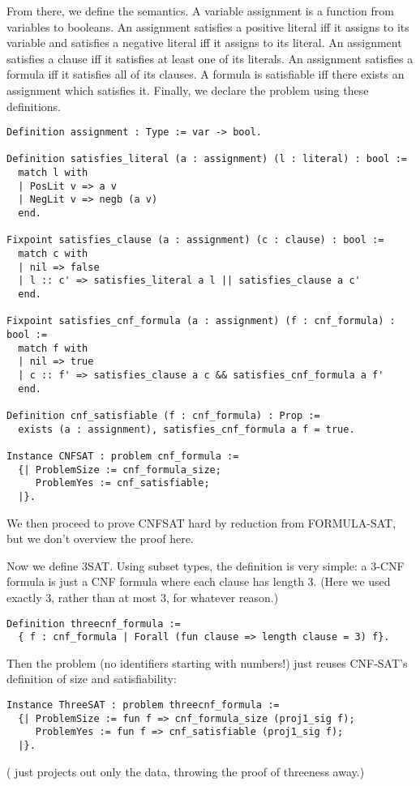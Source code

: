 \documentclass{article}
\begin{document}
From there, we define the semantics. A variable assignment is a function from
variables to booleans. An assignment satisfies a positive literal iff it assigns
 to its variable and satisfies a negative literal iff it assigns
 to its literal. An assignment satisfies a clause iff it satisfies at
least one of its literals. An assignment satisfies a formula iff it satisfies
all of its clauses. A formula is satisfiable iff there exists an assignment
which satisfies it. Finally, we declare the problem  using these
definitions.
\begin{samepage}
  \begin{verbatim}
Definition assignment : Type := var -> bool.

Definition satisfies_literal (a : assignment) (l : literal) : bool :=
  match l with
  | PosLit v => a v
  | NegLit v => negb (a v)
  end.

Fixpoint satisfies_clause (a : assignment) (c : clause) : bool :=
  match c with
  | nil => false
  | l :: c' => satisfies_literal a l || satisfies_clause a c'
  end.

Fixpoint satisfies_cnf_formula (a : assignment) (f : cnf_formula) : bool :=
  match f with
  | nil => true
  | c :: f' => satisfies_clause a c && satisfies_cnf_formula a f'
  end.

Definition cnf_satisfiable (f : cnf_formula) : Prop :=
  exists (a : assignment), satisfies_cnf_formula a f = true.

Instance CNFSAT : problem cnf_formula :=
  {| ProblemSize := cnf_formula_size;
     ProblemYes := cnf_satisfiable;
  |}.
  \end{verbatim}
\end{samepage}

We then proceed to prove CNFSAT hard by reduction from FORMULA-SAT, but we don't
overview the proof here.

Now we define 3SAT. Using subset types, the definition is very simple: a 3-CNF
formula is just a CNF formula where each clause has length 3. (Here we used
exactly 3, rather than at most 3, for whatever reason.)
\begin{samepage}
  \begin{verbatim}
Definition threecnf_formula :=
  { f : cnf_formula | Forall (fun clause => length clause = 3) f}.
  \end{verbatim}
\end{samepage}

Then the problem  (no identifiers starting with numbers!) just
reuses CNF-SAT's definition of size and satisfiability:
\begin{samepage}
  \begin{verbatim}
Instance ThreeSAT : problem threecnf_formula :=
  {| ProblemSize := fun f => cnf_formula_size (proj1_sig f);
     ProblemYes := fun f => cnf_satisfiable (proj1_sig f);
  |}.
  \end{verbatim}
\end{samepage}
( just projects out only the data, throwing the proof of
threeness away.)
\end{document}
